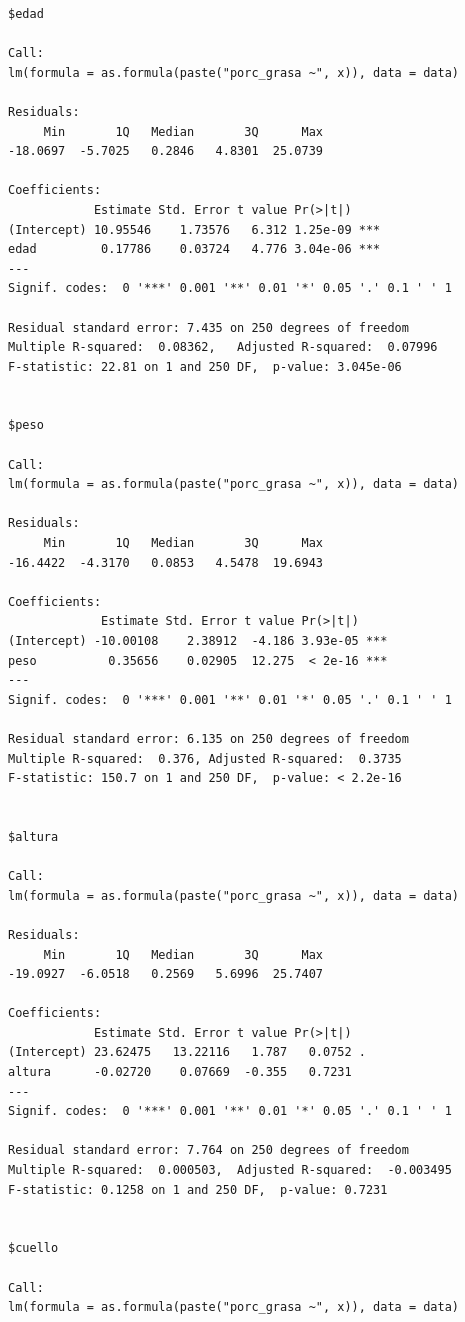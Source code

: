 \documentclass[
  letterpaper,
  DIV=11,
  numbers=noendperiod]{scrartcl}
\begin{document}
\begin{verbatim}
$edad

Call:
lm(formula = as.formula(paste("porc_grasa ~", x)), data = data)

Residuals:
     Min       1Q   Median       3Q      Max 
-18.0697  -5.7025   0.2846   4.8301  25.0739 

Coefficients:
            Estimate Std. Error t value Pr(>|t|)    
(Intercept) 10.95546    1.73576   6.312 1.25e-09 ***
edad         0.17786    0.03724   4.776 3.04e-06 ***
---
Signif. codes:  0 '***' 0.001 '**' 0.01 '*' 0.05 '.' 0.1 ' ' 1

Residual standard error: 7.435 on 250 degrees of freedom
Multiple R-squared:  0.08362,   Adjusted R-squared:  0.07996 
F-statistic: 22.81 on 1 and 250 DF,  p-value: 3.045e-06


$peso

Call:
lm(formula = as.formula(paste("porc_grasa ~", x)), data = data)

Residuals:
     Min       1Q   Median       3Q      Max 
-16.4422  -4.3170   0.0853   4.5478  19.6943 

Coefficients:
             Estimate Std. Error t value Pr(>|t|)    
(Intercept) -10.00108    2.38912  -4.186 3.93e-05 ***
peso          0.35656    0.02905  12.275  < 2e-16 ***
---
Signif. codes:  0 '***' 0.001 '**' 0.01 '*' 0.05 '.' 0.1 ' ' 1

Residual standard error: 6.135 on 250 degrees of freedom
Multiple R-squared:  0.376, Adjusted R-squared:  0.3735 
F-statistic: 150.7 on 1 and 250 DF,  p-value: < 2.2e-16


$altura

Call:
lm(formula = as.formula(paste("porc_grasa ~", x)), data = data)

Residuals:
     Min       1Q   Median       3Q      Max 
-19.0927  -6.0518   0.2569   5.6996  25.7407 

Coefficients:
            Estimate Std. Error t value Pr(>|t|)  
(Intercept) 23.62475   13.22116   1.787   0.0752 .
altura      -0.02720    0.07669  -0.355   0.7231  
---
Signif. codes:  0 '***' 0.001 '**' 0.01 '*' 0.05 '.' 0.1 ' ' 1

Residual standard error: 7.764 on 250 degrees of freedom
Multiple R-squared:  0.000503,  Adjusted R-squared:  -0.003495 
F-statistic: 0.1258 on 1 and 250 DF,  p-value: 0.7231


$cuello

Call:
lm(formula = as.formula(paste("porc_grasa ~", x)), data = data)


\end{verbatim}
\end{document}
